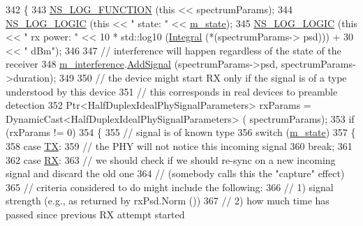 \begin{DoxyCode}
342 \{
343   \hyperlink{log-macros-disabled_8h_a90b90d5bad1f39cb1b64923ea94c0761}{NS\_LOG\_FUNCTION} (\textcolor{keyword}{this} << spectrumParams);
344   \hyperlink{group__logging_ga88acd260151caf2db9c0fc84997f45ce}{NS\_LOG\_LOGIC} (\textcolor{keyword}{this} << \textcolor{stringliteral}{" state: "} << \hyperlink{classns3_1_1HalfDuplexIdealPhy_a6b5ae8a00ae9c4e50b2a099a534a1863}{m\_state});
345   \hyperlink{group__logging_ga88acd260151caf2db9c0fc84997f45ce}{NS\_LOG\_LOGIC} (\textcolor{keyword}{this} << \textcolor{stringliteral}{" rx power: "} << 10 * std::log10 (\hyperlink{namespacens3_a3dd3817567502f8bc77b04e47134c070}{Integral} (*(spectrumParams->
      psd))) + 30 << \textcolor{stringliteral}{" dBm"});
346 
347   \textcolor{comment}{// interference will happen regardless of the state of the receiver}
348   \hyperlink{classns3_1_1HalfDuplexIdealPhy_a3e647be1ceaacc562ea02dc6210bc32a}{m\_interference}.\hyperlink{classns3_1_1SpectrumInterference_afa383d6ec1a4b78ce3256da6b959c986}{AddSignal} (spectrumParams->psd, spectrumParams->duration);
349 
350   \textcolor{comment}{// the device might start RX only if the signal is of a type understood by this device}
351   \textcolor{comment}{// this corresponds in real devices to preamble detection}
352   Ptr<HalfDuplexIdealPhySignalParameters> rxParams = DynamicCast<HalfDuplexIdealPhySignalParameters> (
      spectrumParams);
353   \textcolor{keywordflow}{if} (rxParams != 0)
354     \{
355       \textcolor{comment}{// signal is of known type}
356       \textcolor{keywordflow}{switch} (\hyperlink{classns3_1_1HalfDuplexIdealPhy_a6b5ae8a00ae9c4e50b2a099a534a1863}{m\_state})
357         \{
358         \textcolor{keywordflow}{case} \hyperlink{classns3_1_1HalfDuplexIdealPhy_acc684e2a6ce03ae8ff429ce480f61c3aa6e02b7c513143f623f71938508be304e}{TX}:
359           \textcolor{comment}{// the PHY will not notice this incoming signal}
360           \textcolor{keywordflow}{break};
361 
362         \textcolor{keywordflow}{case} \hyperlink{classns3_1_1HalfDuplexIdealPhy_acc684e2a6ce03ae8ff429ce480f61c3aad9131877f1e84394458c8e767df5466e}{RX}:
363           \textcolor{comment}{// we should check if we should re-sync on a new incoming signal and discard the old one}
364           \textcolor{comment}{// (somebody calls this the "capture" effect)}
365           \textcolor{comment}{// criteria considered to do might include the following:}
366           \textcolor{comment}{//  1) signal strength (e.g., as returned by rxPsd.Norm ())}
367           \textcolor{comment}{//  2) how much time has passed since previous RX attempt started}

\end{DoxyCode}
